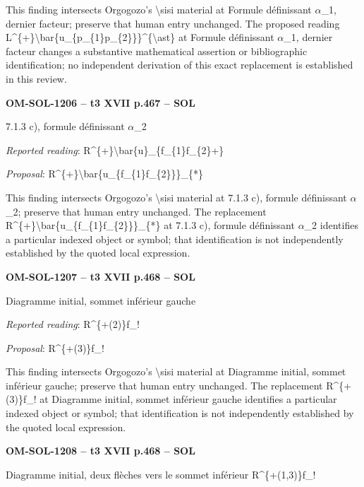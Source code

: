 This finding intersects Orgogozo's \textbackslash{}sisi material at Formule définissant \ensuremath{\alpha}\_1, dernier facteur; preserve that human entry unchanged. The proposed reading L\textasciicircum{}\{+\}\textbackslash{}bar\{u\_\{p\_\{1\}p\_\{2\}\}\}\textasciicircum{}\{\textbackslash{}ast\} at Formule définissant \ensuremath{\alpha}\_1, dernier facteur changes a substantive mathematical assertion or bibliographic identification; no independent derivation of this exact replacement is established in this review.\par
\par\noindent\textbf{OM-SOL-1206 -- t3 XVII p.467 -- SOL}\par
7.1.3 c), formule définissant \ensuremath{\alpha}\_2\par
\emph{Reported reading}: R\textasciicircum{}\{+\}\textbackslash{}bar\{u\}\_\{f\_\{1\}f\_\{2\}+\}\par
\emph{Proposal}: R\textasciicircum{}\{+\}\textbackslash{}bar\{u\_\{f\_\{1\}f\_\{2\}\}\}\_\{*\}\par
This finding intersects Orgogozo's \textbackslash{}sisi material at 7.1.3 c), formule définissant \ensuremath{\alpha}\_2; preserve that human entry unchanged. The replacement R\textasciicircum{}\{+\}\textbackslash{}bar\{u\_\{f\_\{1\}f\_\{2\}\}\}\_\{*\} at 7.1.3 c), formule définissant \ensuremath{\alpha}\_2 identifies a particular indexed object or symbol; that identification is not independently established by the quoted local expression.\par
\par\noindent\textbf{OM-SOL-1207 -- t3 XVII p.468 -- SOL}\par
Diagramme initial, sommet inférieur gauche\par
\emph{Reported reading}: R\textasciicircum{}\{+(2)\}f\_!\par
\emph{Proposal}: R\textasciicircum{}\{+(3)\}f\_!\par
This finding intersects Orgogozo's \textbackslash{}sisi material at Diagramme initial, sommet inférieur gauche; preserve that human entry unchanged. The replacement R\textasciicircum{}\{+(3)\}f\_! at Diagramme initial, sommet inférieur gauche identifies a particular indexed object or symbol; that identification is not independently established by the quoted local expression.\par
\par\noindent\textbf{OM-SOL-1208 -- t3 XVII p.468 -- SOL}\par
Diagramme initial, deux flèches vers le sommet inférieur R\textasciicircum{}\{+(1,3)\}f\_!\par
